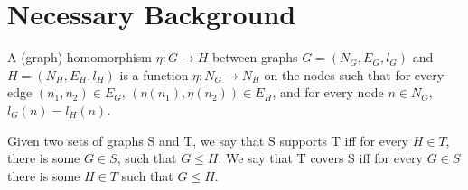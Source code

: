 \section{Necessary Background}

\begin{definition}[Homomorphism]
    A (graph) homomorphism $\eta : G \to H$ between graphs $G = (N_G, E_G, l_G)$ and $H = (N_H, E_H, l_H)$ is a function $\eta : N_G \to N_H$ on the nodes such that for every edge $(n_1, n_2) \in E_G$, $(\eta(n_1), \eta(n_2)) \in E_H$, and for every node $n \in N_G$, $l_G(n) = l_H(n)$.  \cite{Rowe:2021:OnOrdering}
\end{definition}

\begin{definition}
    Given two sets of graphs S and T, we say that S supports T iff for every $H \in T$, there is some $G \in S$, such that $G \leq H$. We  say that T covers S iff for every $G \in S$ there is some $H \in T$ such that $G \leq H. $\cite{Rowe:2021:OnOrdering}
\end{definition}



